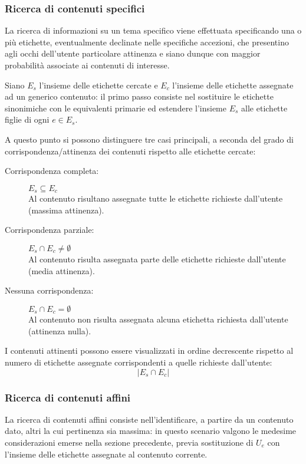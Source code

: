 \documentclass[10pt,a4paper,headinclude,footinclude,hidelinks]{scrreprt} %
\begin{document}
	\subsubsection{Ricerca di contenuti specifici}
	La ricerca di informazioni su un tema specifico viene effettuata specificando una o più etichette, eventualmente declinate nelle specifiche accezioni, che presentino agli occhi dell'utente particolare attinenza e siano dunque con maggior probabilità associate ai contenuti di interesse.

	Siano $E_s$ l'insieme delle etichette cercate e $E_c$ l'insieme delle etichette assegnate ad un generico contenuto: il primo passo consiste nel sostituire le etichette sinonimiche con le equivalenti primarie ed estendere l'insieme $E_s$ alle etichette figlie di ogni $e \in E_s$.

	A questo punto si possono distinguere tre casi principali, a seconda del grado di corrispondenza/attinenza dei contenuti rispetto alle etichette cercate:
	\begin{description}
	\item[Corrispondenza completa:] $E_s \subseteq E_c$ \hfill \\
	Al contenuto risultano assegnate tutte le etichette richieste dall'utente (massima attinenza).
 	\item[Corrispondenza parziale:] $E_s \cap E_c \neq \emptyset$ \hfill \\
	Al contenuto risulta assegnata parte delle etichette richieste dall'utente (media attinenza).
	\item[Nessuna corrispondenza:] $E_s \cap E_c = \emptyset$\hfill \\
	Al contenuto non risulta assegnata alcuna etichetta richiesta dall'utente (attinenza nulla).
	\end{description}

	I contenuti attinenti possono essere visualizzati in ordine decrescente rispetto al numero di etichette assegnate corrispondenti a quelle richieste dall'utente:
	$$\left|{E_s \cap E_c}\right|$$

	\subsubsection{Ricerca di contenuti affini}
	La ricerca di contenuti affini consiste nell'identificare, a partire da un contenuto dato, altri la cui pertinenza sia massima: in questo scenario valgono le medesime considerazioni emerse nella sezione precedente, previa sostituzione di $U_e$ con l'insieme delle etichette assegnate al contenuto corrente.
\end{document}
